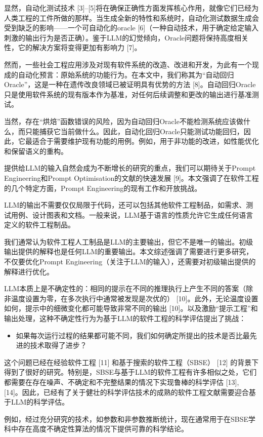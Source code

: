 \begin{translation}
显然，自动化测试技术 [3]–[5]将在确保正确性方面发挥核心作用，就像它们已经为人类工程的工件所做的那样。当生成全新的特性和系统时，自动化测试数据生成会受到缺乏的影响——一个可自动化的oracle [6]（一种自动技术，用于确定给定输入刺激的输出行为是否正确）。鉴于LLM的幻觉倾向，Oracle问题将保持高度相关性，它的解决方案将变得更加有影响力 [7]。

然而，一些社会工程应用涉及对现有软件系统的改造、改进和开发，为此有一个现成的自动化预言：原始系统的功能行为。在本文中，我们称其为“自动回归Oracle”，这是一种在遗传改良领域已被证明具有优势的方法 [8]。自动回归Oracle只是使用软件系统的现有版本作为基准，对任何后续调整和更改的输出进行基准测试。

当然，存在“烘焙”函数错误的风险，因为自动回归Oracle不能检测系统应该做什么，而只能捕获它当前做什么。因此，自动化回归Oracle只能测试功能回归，因此，它最适合于需要维护现有功能的用例。例如，用于非功能的改进，如性能优化和保留语义的重构。

提供给LLM的输入自然会成为不断增长的研究的重点，我们可以期待关于Prompt Engineering和Prompt Optimisation的文献的快速发展 [9]。本文强调了在软件工程的几个特定方面，Prompt Engineering的现有工作和开放挑战。

LLM的输出不需要仅仅局限于代码，还可以包括其他软件工程制品，如需求、测试用例、设计图表和文档。一般来说，LLM基于语言的性质允许它生成任何语言定义的软件工程制品。

我们通常认为软件工程人工制品是LLM的主要输出，但它不是唯一的输出。初级输出提供的解释也是任何LLM的重要输出。本文综述强调了需要进行更多研究，不仅要优化Prompt Engineering（关注于LLM的输入），还需要对初级输出提供的解释进行优化。

LLM本质上是不确定性的：相同的提示在不同的推理执行上产生不同的答案（除非温度设置为零，在多次执行中通常被发现是次优的） [10]。此外，无论温度设置如何，提示中的细微变化都可能导致非常不同的输出 [10]。以及激励“提示工程”和输出处理，这种不确定性行为为基于LLM的软件工程的科学评估提出了挑战：
\begin{itemize}
    \item 如果每次运行过程的结果都可能不同，我们如何确定所提出的技术是否比最先进的技术取得了进步？
\end{itemize}

这个问题已经在经验软件工程 [11] 和基于搜索的软件工程（SBSE） [12] 的背景下得到了很好的研究。特别是，SBSE与基于LLM的软件工程有许多相似之处，它们都需要在存在噪声、不确定和不完整结果的情况下实现鲁棒的科学评估 [13], [14]。因此，已经有了关于健壮的科学评估技术的成熟的软件工程文献需要迎合基于LLM的科学评估。

例如，经过充分研究的技术，如参数和非参数推断统计，现在通常用于在SBSE学科中存在高度不确定性算法的情况下提供可靠的科学结论。


\end{translation}
